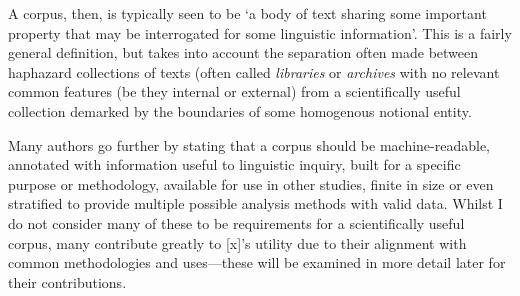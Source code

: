 
A corpus, then, is typically seen to be `a body of text sharing some important property that may be interrogated for some linguistic information'.  This is a fairly general definition, but takes into account the separation often made between haphazard collections of texts (often called \textsl{libraries} or \textsl{archives} with no relevant common features (be they internal or external) from a scientifically useful collection demarked by the boundaries of some homogenous notional entity.

Many authors %
go further by stating that a corpus should be machine-readable, annotated with information useful to linguistic inquiry, built for a specific purpose or methodology, available for use in other studies, finite in size or even stratified to provide multiple possible analysis methods with valid data.  Whilst I do not consider many of these to be requirements for a scientifically useful corpus, many contribute greatly to [x]'s utility due to their alignment with common methodologies and uses---these will be examined in more detail later for their contributions.









